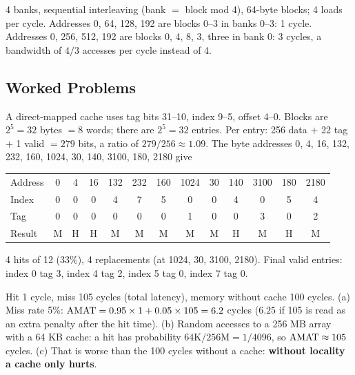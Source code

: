 \begin{eg}
4 banks, sequential interleaving (bank $=$ block mod 4), 64-byte blocks; 4 loads per
cycle. Addresses 0, 64, 128, 192 are blocks 0--3 in banks 0--3: 1 cycle. Addresses
0, 256, 512, 192 are blocks 0, 4, 8, 3, three in bank 0: 3 cycles, a bandwidth of
$4/3$ accesses per cycle instead of 4.
\end{eg}

\subsection{Worked Problems}
\label{sec:cache-problems}

\begin{eg}
A direct-mapped cache uses tag bits 31--10, index 9--5, offset 4--0. Blocks are
$2^5=32$ bytes $=8$ words; there are $2^5=32$ entries. Per entry: 256 data $+$ 22
tag $+$ 1 valid $=279$ bits, a ratio of $279/256\approx1.09$. The byte addresses
0, 4, 16, 132, 232, 160, 1024, 30, 140, 3100, 180, 2180 give
\begin{center}
\small
\setlength{\tabcolsep}{3pt}
\begin{tabular}{@{}lcccccccccccc@{}}
\toprule
Address & 0 & 4 & 16 & 132 & 232 & 160 & 1024 & 30 & 140 & 3100 & 180 & 2180 \\
Index & 0 & 0 & 0 & 4 & 7 & 5 & 0 & 0 & 4 & 0 & 5 & 4 \\
Tag & 0 & 0 & 0 & 0 & 0 & 0 & 1 & 0 & 0 & 3 & 0 & 2 \\
Result & M & H & H & M & M & M & M & M & H & M & H & M \\
\bottomrule
\end{tabular}
\end{center}
4 hits of 12 (33\%), 4 replacements (at 1024, 30, 3100, 2180). Final valid
entries: index 0 tag 3, index 4 tag 2, index 5 tag 0, index 7 tag 0.
\end{eg}

\begin{eg}
Hit 1 cycle, miss 105 cycles (total latency), memory without cache 100 cycles.
(a) Miss rate 5\%: $\mathrm{AMAT}=0.95\times1+0.05\times105=6.2$ cycles ($6.25$ if 105 is
read as an extra penalty after the hit time). (b) Random accesses to a 256 MB
array with a 64 KB cache: a hit has probability $64\text{K}/256\text{M}=1/4096$, so
$\mathrm{AMAT}\approx105$ cycles. (c) That is worse than the 100 cycles without a cache:
\textbf{without locality a cache only hurts}.
\end{eg}

